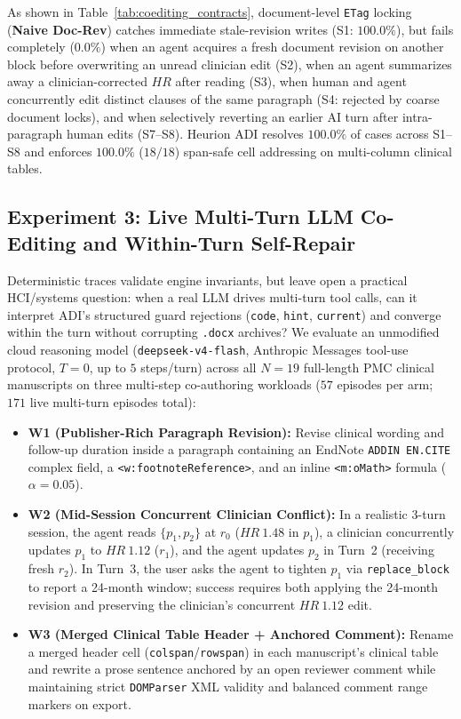 \documentclass[11pt,a4paper]{article}
\begin{document}
As shown in Table~\ref{tab:coediting_contracts}, document-level \texttt{ETag} locking (\textbf{Naive Doc-Rev}) catches immediate stale-revision writes (S1: $100.0\%$), but fails completely ($0.0\%$) when an agent acquires a fresh document revision on another block before overwriting an unread clinician edit (S2), when an agent summarizes away a clinician-corrected $HR$ after reading (S3), when human and agent concurrently edit distinct clauses of the same paragraph (S4: rejected by coarse document locks), and when selectively reverting an earlier AI turn after intra-paragraph human edits (S7--S8). Heurion ADI resolves $100.0\%$ of cases across S1--S8 and enforces $100.0\%$ ($18/18$) span-safe cell addressing on multi-column clinical tables.

\subsection{Experiment 3: Live Multi-Turn LLM Co-Editing and Within-Turn Self-Repair}
\label{sec:online_llm}
Deterministic traces validate engine invariants, but leave open a practical HCI/systems question: when a real LLM drives multi-turn tool calls, can it interpret ADI's structured guard rejections (\texttt{code}, \texttt{hint}, \texttt{current}) and converge within the turn without corrupting \texttt{.docx} archives? We evaluate an unmodified cloud reasoning model (\texttt{deepseek-v4-flash}, Anthropic Messages tool-use protocol, $T=0$, up to $5$ steps/turn) across all $N=19$ full-length PMC clinical manuscripts on three multi-step co-authoring workloads ($57$ episodes per arm; $171$ live multi-turn episodes total):
\begin{itemize}[leftmargin=1.5em,itemsep=1pt]
  \item \textbf{W1 (Publisher-Rich Paragraph Revision):} Revise clinical wording and follow-up duration inside a paragraph containing an EndNote \texttt{ADDIN EN.CITE} complex field, a \texttt{<w:footnoteReference>}, and an inline \texttt{<m:oMath>} formula ($\alpha=0.05$).
  \item \textbf{W2 (Mid-Session Concurrent Clinician Conflict):} In a realistic 3-turn session, the agent reads $\{p_1, p_2\}$ at $r_0$ ($HR~1.48$ in $p_1$), a clinician concurrently updates $p_1$ to $HR~1.12$ ($r_1$), and the agent updates $p_2$ in Turn~2 (receiving fresh $r_2$). In Turn~3, the user asks the agent to tighten $p_1$ via \texttt{replace\_block} to report a 24-month window; success requires both applying the 24-month revision and preserving the clinician's concurrent $HR~1.12$ edit.
  \item \textbf{W3 (Merged Clinical Table Header + Anchored Comment):} Rename a merged header cell (\texttt{colspan}/\texttt{rowspan}) in each manuscript's clinical table and rewrite a prose sentence anchored by an open reviewer comment while maintaining strict \texttt{DOMParser} XML validity and balanced comment range markers on export.
\end{itemize}
\end{document}

